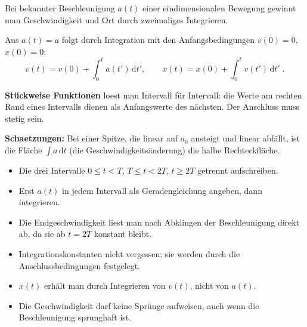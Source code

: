 

Bei bekannter Beschleunigung $a(t)$ einer eindimensionalen Bewegung
gewinnt man Geschwindigkeit und Ort durch zweimaliges Integrieren.

\begin{werkzeugkasten}[Werkzeuge]
Aus $a(t)=a$ folgt durch Integration mit den Anfangsbedingungen
$v(0)=0$, $x(0)=0$:
\begin{equation}
  v(t)=v(0)+\int_0^t a(t')\,\mathrm dt',\qquad
  x(t)=x(0)+\int_0^t v(t')\,\mathrm dt'\;.
\end{equation}

\textbf{Stückweise Funktionen} loest man Intervall für Intervall: die
Werte am rechten Rand eines Intervalls dienen als Anfangswerte des
nächsten. Der Anschluss muss stetig sein.

\textbf{Schaetzungen:} Bei einer Spitze, die linear auf $a_0$ ansteigt und
linear abfällt, ist die Fläche $\int a\,\mathrm dt$ (die
Geschwindigkeitsänderung) die halbe Rechteckfläche.
\end{werkzeugkasten}

\begin{werkzeugkasten}[Vorgehen]
\begin{itemize}
  \item Die drei Intervalle $0\le t<T$, $T\le t<2T$, $t\ge2T$ getrennt
        aufschreiben.
  \item Erst $a(t)$ in jedem Intervall als Geradengleichung angeben, dann
        integrieren.
  \item Die Endgeschwindigkeit liest man nach Abklingen der Beschleunigung
        direkt ab, da sie ab $t=2T$ konstant bleibt.
\end{itemize}
\end{werkzeugkasten}

\begin{achtung}
\begin{itemize}
  \item Integrationskonstanten nicht vergessen; sie werden durch die
        Anschlussbedingungen festgelegt.
  \item $x(t)$ erhält man durch Integrieren von $v(t)$, nicht von $a(t)$.
  \item Die Geschwindigkeit darf keine Sprünge aufweisen, auch wenn die
        Beschleunigung sprunghaft ist.
\end{itemize}
\end{achtung}
